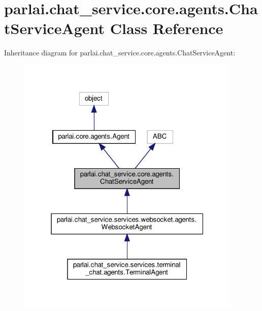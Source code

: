 \hypertarget{classparlai_1_1chat__service_1_1core_1_1agents_1_1ChatServiceAgent}{}\section{parlai.\+chat\+\_\+service.\+core.\+agents.\+Chat\+Service\+Agent Class Reference}
\label{classparlai_1_1chat__service_1_1core_1_1agents_1_1ChatServiceAgent}


Inheritance diagram for parlai.\+chat\+\_\+service.\+core.\+agents.\+Chat\+Service\+Agent\+:
\nopagebreak
\begin{figure}[H]
\begin{center}
\leavevmode
\includegraphics[width=304pt]{d7/df5/classparlai_1_1chat__service_1_1core_1_1agents_1_1ChatServiceAgent__inherit__graph}
\end{center}
\end{figure}


